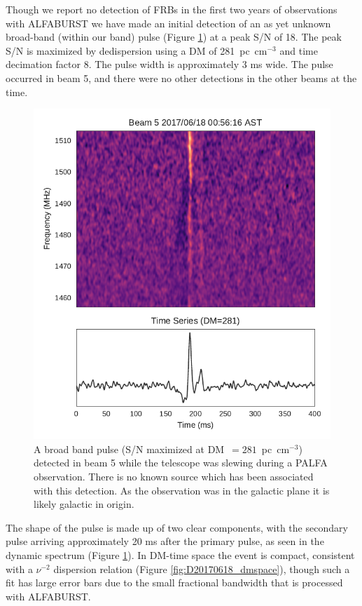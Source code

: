\documentclass[a4paper,fleqn,usenatbib]{mnras}
\begin{document}
Though we report no detection of FRBs in the first two years of observations
with ALFABURST we have made an initial detection of an as yet unknown broad-band
(within our band) pulse (Figure \ref{fig:D20170618_spectrum}) at a peak S/N of
18. The peak S/N is maximized by dedispersion using a DM of 281~pc~cm$^{-3}$ and
time decimation factor 8. The pulse width is approximately 3 ms wide. The pulse
occurred in beam 5, and there were no other detections in the other beams at the
time.

\begin{figure}
    \includegraphics[width=1.0\linewidth]{figures/Beam5_fb_D20170618T005616_buffer2_spectrum.pdf}
    \caption{A broad band pulse (S/N maximized at DM~$=281$~pc~cm$^{-3}$)
    detected in beam 5 while the telescope was slewing during a PALFA
    observation. There is no known source which has been associated with this
    detection. As the observation was in the galactic plane it is likely
    galactic in origin.
    }
    \label{fig:D20170618_spectrum}
\end{figure}

The shape of the pulse is made up of two clear components, with the secondary
pulse arriving approximately 20 ms after the primary pulse, as seen in the
dynamic spectrum (Figure \ref{fig:D20170618_spectrum}). In DM-time space the
event is compact, consistent with a $\nu^{-2}$ dispersion relation (Figure
\ref{fig:D20170618_dmspace}), though such a fit has large error bars due to the
small fractional bandwidth that is processed with ALFABURST.
\end{document}

